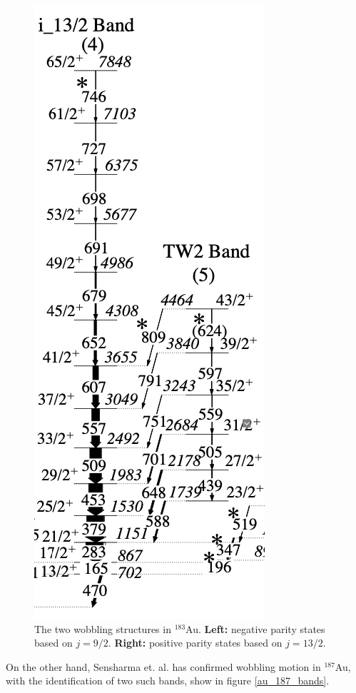\documentclass[12pt, a4paper]{article}
\begin{document}
\begin{figure}[ht]
    \includegraphics[scale=0.25]{figs/positive_Au183.png}
    \caption{The two wobbling structures in $^{183}$Au. \textbf{Left:} negative parity states based on $j=9/2$. \textbf{Right:} positive parity states based on $j=13/2$.}
    \label{au_183_bands}
\end{figure}

On the other hand, Sensharma et. al. \cite{sensharma2020} has confirmed wobbling motion in $^{187}$Au, with the identification of two such bands, show in figure \ref{au_187_bands}.
\end{document}
